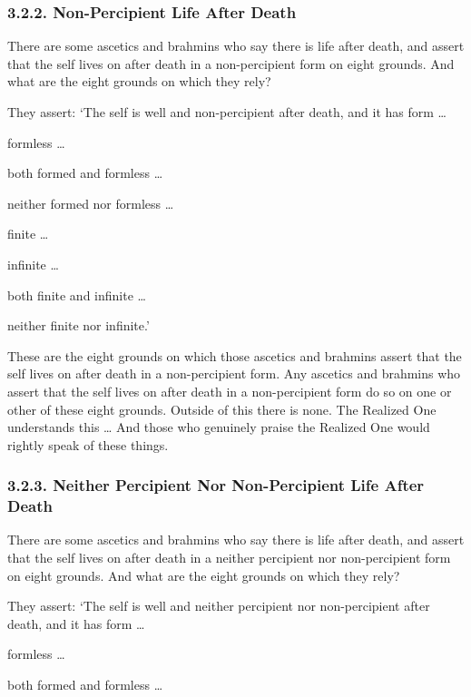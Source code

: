 \documentclass[12pt,openany]{book}%
\begin{document}
\subsubsection*{3.2.2. Non-Percipient Life After Death }

There are some ascetics and brahmins who say there is life after death, and assert that the self lives on after death in a non-percipient form on eight grounds. And what are the eight grounds on which they rely? 

They assert: ‘The self is well and non-percipient after death, and it has form … 

formless … 

both formed and formless … 

neither formed nor formless … 

finite … 

infinite … 

both finite and infinite … 

neither finite nor infinite.’ 

These are the eight grounds on which those ascetics and brahmins assert that the self lives on after death in a non-percipient form. Any ascetics and brahmins who assert that the self lives on after death in a non-percipient form do so on one or other of these eight grounds. Outside of this there is none. The Realized One understands this … And those who genuinely praise the Realized One would rightly speak of these things. 

\subsubsection*{3.2.3. Neither Percipient Nor Non-Percipient Life After Death }

There are some ascetics and brahmins who say there is life after death, and assert that the self lives on after death in a neither percipient nor non-percipient form on eight grounds. And what are the eight grounds on which they rely? 

They assert: ‘The self is well and neither percipient nor non-percipient after death, and it has form … 

formless … 

both formed and formless … 
\end{document}
